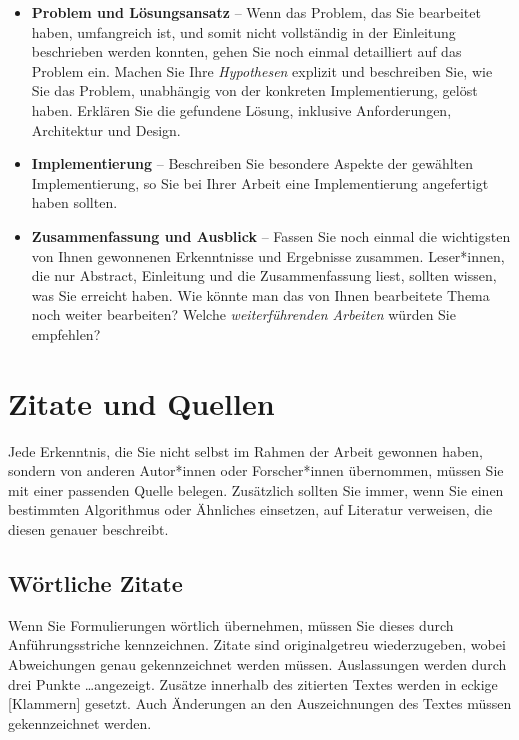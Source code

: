\documentclass[a4paper,11pt,headings=normal]{scrartcl}
\begin{document}
\begin{itemize}
\item \textbf{Problem und Lösungsansatz} -- Wenn das Problem, das Sie bearbeitet haben, umfangreich ist, und somit nicht vollständig in der Einleitung beschrieben werden konnten, gehen Sie noch einmal detailliert auf das Problem ein. Machen Sie Ihre \textit{Hypothesen} explizit und beschreiben Sie, wie Sie das Problem, unabhängig von der konkreten Implementierung, gelöst haben. Erklären Sie die gefundene Lösung, inklusive Anforderungen, Architektur und Design.

\item \textbf{Implementierung} -- Beschreiben Sie besondere Aspekte der gewählten Implementierung, so Sie bei Ihrer Arbeit eine Implementierung angefertigt haben sollten.

\item \textbf{Zusammenfassung und Ausblick} -- Fassen Sie noch einmal die wichtigsten von Ihnen gewonnenen Erkenntnisse und Ergebnisse zusammen. Leser*innen, die nur Abstract, Einleitung und die Zusammenfassung liest, sollten wissen, was Sie erreicht haben. Wie könnte man das von Ihnen bearbeitete Thema noch weiter bearbeiten? Welche \textit{weiterführenden Arbeiten} würden Sie empfehlen?
\end{itemize}

\section{Zitate und Quellen}
Jede Erkenntnis, die Sie nicht selbst im Rahmen der Arbeit gewonnen haben, sondern von anderen Autor*innen oder Forscher*innen übernommen, müssen Sie mit einer passenden Quelle belegen. Zusätzlich sollten Sie immer, wenn Sie einen bestimmten Algorithmus oder Ähnliches einsetzen, auf Literatur verweisen, die diesen genauer beschreibt.

\subsection{Wörtliche Zitate}
Wenn Sie Formulierungen wörtlich übernehmen, müssen Sie dieses durch Anführungsstriche kennzeichnen. Zitate sind originalgetreu wiederzugeben, wobei Abweichungen genau gekennzeichnet werden müssen. Auslassungen werden durch drei Punkte \dots angezeigt. Zusätze innerhalb des zitierten Textes werden in eckige [Klammern] gesetzt. Auch Änderungen an den Auszeichnungen des Textes müssen gekennzeichnet werden.
\end{document}
